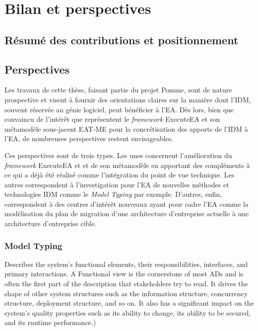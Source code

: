 \chapter{Bilan et perspectives}
\label{ch:bilan}

\PartialToc

\section{Résumé des contributions et positionnement}

\section{Perspectives}

Les travaux de cette thèse, faisant partie du projet Pomme, sont de nature prospective et visent à fournir 
des orientations claires sur la manière dont l'IDM, souvent réservée au génie logiciel, peut bénéficier à l'EA.
Dès lors, bien que convaincu de l'intérêt que représentent le \emph{framework} ExecuteEA et son métamodèle sous-jacent
EAT-ME pour la concrétisation des apports de l'IDM à l'EA, de nombreuses perspectives restent envisageables.

Ces perspectives sont de trois types. Les unes concernent l'amélioration du \emph{framework} ExecuteEA et 
et de son métamodèle en apportant des compléments à ce qui a déjà été réalisé comme l'intégration
du point de vue technique. Les autres correspondent à l'investigation pour l'EA
de nouvelles méthodes et technologies IDM comme le \emph{Model Typing} par exemple. D'autres, enfin,
correspondent à des centres d'intérêt nouveaux ayant pour cadre l'EA comme la modélisation du plan de migration
d'une architecture d'entreprise actuelle à une architecture d'entreprise cible.



    \subsection{Model Typing}

 Describes the system’s functional elements, their responsibilities,
interfaces, and primary interactions. A Functional view is the cornerstone of
most ADs and is often the first part of the description that stakeholders try
to read. It drives the shape of other system structures such as the information
structure, concurrency structure, deployment structure, and so on. It also has a 
significant impact on the system’s quality properties such as its ability to
change, its ability to be secured, and its runtime performance.) 

